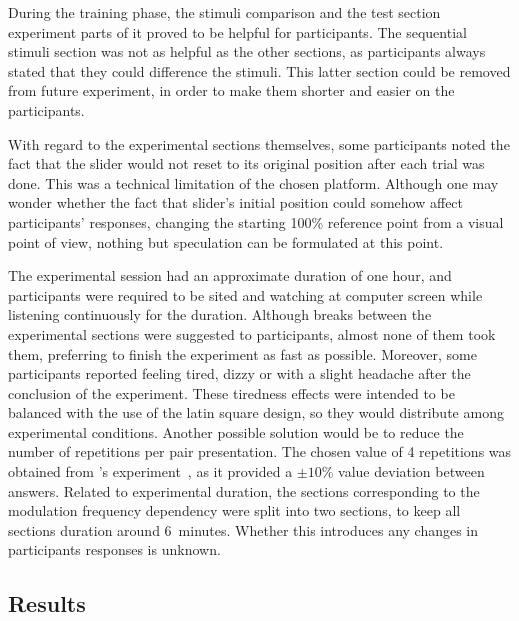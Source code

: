 \documentclass[../main.tex]{subfiles}
\begin{document}
During the training phase, the stimuli comparison and the test section
experiment parts of it proved to be helpful for participants. The sequential
stimuli section was not as helpful as the other sections, as participants
always stated that they could difference the stimuli. This latter section
could be removed from future experiment, in order to make them shorter and
easier on the participants.

With regard to the experimental sections themselves, some participants noted
the fact that the slider would not reset to its original position after each
trial was done. This was a technical limitation of the chosen platform. Although
one may wonder whether the fact that slider's initial position could somehow
affect participants' responses, changing the starting 100\% reference point from
a visual point of view, nothing but speculation can be formulated at this point.

The experimental session had an approximate duration of one hour, and
participants were required to be sited and watching at computer screen while
listening continuously for the duration. Although breaks between the
experimental sections were suggested to participants, almost none of them took
them, preferring to finish the experiment as fast as possible. Moreover, some
participants reported feeling tired, dizzy or with a slight headache after the
conclusion of the experiment. These tiredness effects were intended to be
balanced with the use of the latin square design, so they would distribute among
experimental conditions. Another possible solution would be to reduce the number
of repetitions per pair presentation. The chosen value of 4 repetitions was
obtained from \citeauthor{Fastl1982Fluctuation}'s
experiment~\cite{Fastl1982Fluctuation}, as it provided a $\pm10$\% value
deviation between answers. Related to experimental duration, the sections
corresponding to the modulation frequency dependency were split into two
sections, to keep all sections duration around 6~minutes. Whether this
introduces any changes in participants responses is unknown.

\subsection{Results}
\end{document}
